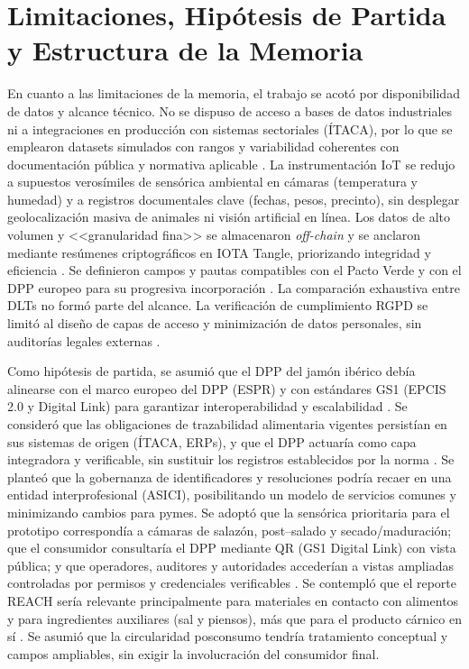 \section{Limitaciones, Hipótesis de Partida y Estructura de la Memoria}\label{sec:intro-limitaciones}
En cuanto a las limitaciones de la memoria, el trabajo se acotó por disponibilidad de datos y alcance técnico. No se dispuso de acceso a bases de datos industriales ni a integraciones en producción con sistemas sectoriales (ÍTACA), por lo que se emplearon datasets simulados con rangos y variabilidad coherentes con documentación pública y normativa aplicable \cite{}. La instrumentación IoT se redujo a supuestos verosímiles de sensórica ambiental en cámaras (temperatura y humedad) y a registros documentales clave (fechas, pesos, precinto), sin desplegar geolocalización masiva de animales ni visión artificial en línea. Los datos de alto volumen y <<granularidad fina>> se almacenaron \textit{off-chain} y se anclaron mediante resúmenes criptográficos en IOTA Tangle, priorizando integridad y eficiencia \cite{}. %
Se definieron campos y pautas compatibles con el Pacto Verde y con el DPP europeo para su progresiva incorporación \cite{}. La comparación exhaustiva entre DLTs no formó parte del alcance. La verificación de cumplimiento RGPD se limitó al diseño de capas de acceso y minimización de datos personales, sin auditorías legales externas \cite{}.

Como hipótesis de partida, se asumió que el DPP del jamón ibérico debía alinearse con el marco europeo del DPP (ESPR) y con estándares GS1 (EPCIS 2.0 y Digital Link) para garantizar interoperabilidad y escalabilidad \cite{}. Se consideró que las obligaciones de trazabilidad alimentaria vigentes persistían en sus sistemas de origen (ÍTACA, ERPs), y que el DPP actuaría como capa integradora y verificable, sin sustituir los registros establecidos por la norma \cite{}. Se planteó que la gobernanza de identificadores y resoluciones podría recaer en una entidad interprofesional (ASICI), posibilitando un modelo de servicios comunes y minimizando cambios para pymes. Se adoptó que la sensórica prioritaria para el prototipo correspondía a cámaras de salazón, post–salado y secado/maduración; que el consumidor consultaría el DPP mediante QR (GS1 Digital Link) con vista pública; y que operadores, auditores y autoridades accederían a vistas ampliadas controladas por permisos y credenciales verificables \cite{}. Se contempló que el reporte REACH sería relevante principalmente para materiales en contacto con alimentos y para ingredientes auxiliares (sal y piensos), más que para el producto cárnico en sí \cite{}. Se asumió que la circularidad posconsumo tendría tratamiento conceptual y campos ampliables, sin exigir la involucración del consumidor final.

